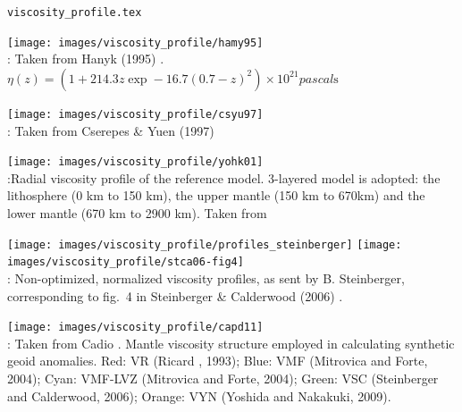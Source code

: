 \begin{flushright} {\tiny {\color{gray} \tt viscosity\_profile.tex}} \end{flushright}


\begin{center}
\texttt{[image: images/viscosity\_profile/hamy95]}\\
{\captionfont \nineteenninetyfive: Taken from Hanyk \etal (1995) \cite{hamy95}. 
$\eta(z)=(1+214.3z\exp-16.7(0.7-z)^2)\times 10^{21}\si{pascal\second}$ }
\end{center}

\begin{center}
\texttt{[image: images/viscosity\_profile/csyu97]}\\
{\captionfont \nineteenninetyseven: Taken from Cserepes \& Yuen (1997) \cite{csyu97}} 
\end{center}

\begin{center}
\texttt{[image: images/viscosity\_profile/yohk01]}\\
{\captionfont \twothousandone:Radial viscosity profile of the reference model. 3-layered model is adopted: 
the lithosphere (0 km to 150 km), the upper mantle (150 km to 670km) 
and the lower mantle (670 km to 2900 km). Taken from \cite{yohk01}}
\end{center}


\begin{center}
\texttt{[image: images/viscosity\_profile/profiles\_steinberger]}
\texttt{[image: images/viscosity\_profile/stca06-fig4]}\\
{\captionfont \twothousandsix:
Non-optimized, normalized viscosity profiles, as sent by B. Steinberger,
corresponding to fig.~4 in Steinberger \& Calderwood (2006) \cite{stca06}.}
\end{center}


\begin{center}
\texttt{[image: images/viscosity\_profile/capd11]}\\
{\captionfont \twothousandeleven: Taken from Cadio \etal \cite{capd11}.
Mantle viscosity structure employed in calculating synthetic geoid anomalies. 
Red: VR (Ricard \etal, 1993); Blue: VMF (Mitrovica and Forte, 2004); Cyan: VMF-LVZ (Mitrovica
and Forte, 2004); Green: VSC (Steinberger and Calderwood, 2006); Orange: VYN (Yoshida and Nakakuki, 2009).}
\end{center}

